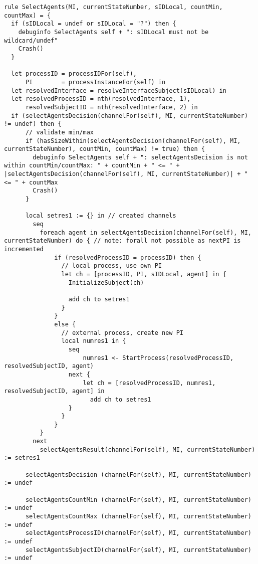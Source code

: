 \begin{listing}[H]
\begin{verbatim}
rule SelectAgents(MI, currentStateNumber, sIDLocal, countMin, countMax) = {
  if (sIDLocal = undef or sIDLocal = "?") then {
    debuginfo SelectAgents self + ": sIDLocal must not be wildcard/undef"
    Crash()
  }

  let processID = processIDFor(self),
      PI        = processInstanceFor(self) in
  let resolvedInterface = resolveInterfaceSubject(sIDLocal) in
  let resolvedProcessID = nth(resolvedInterface, 1),
      resolvedSubjectID = nth(resolvedInterface, 2) in
  if (selectAgentsDecision(channelFor(self), MI, currentStateNumber) != undef) then {
      // validate min/max
      if (hasSizeWithin(selectAgentsDecision(channelFor(self), MI, currentStateNumber), countMin, countMax) != true) then {
        debuginfo SelectAgents self + ": selectAgentsDecision is not within countMin/countMax: " + countMin + " <= " + |selectAgentsDecision(channelFor(self), MI, currentStateNumber)| + " <= " + countMax
        Crash()
      }

      local setres1 := {} in // created channels
        seq
          foreach agent in selectAgentsDecision(channelFor(self), MI, currentStateNumber) do { // note: forall not possible as nextPI is incremented
              if (resolvedProcessID = processID) then {
                // local process, use own PI
                let ch = [processID, PI, sIDLocal, agent] in {
                  InitializeSubject(ch)

                  add ch to setres1
                }
              }
              else {
                // external process, create new PI
                local numres1 in {
                  seq
                      numres1 <- StartProcess(resolvedProcessID, resolvedSubjectID, agent)
                  next {
                      let ch = [resolvedProcessID, numres1, resolvedSubjectID, agent] in
                        add ch to setres1
                  }
                }
              }
          }
        next
          selectAgentsResult(channelFor(self), MI, currentStateNumber) := setres1

      selectAgentsDecision (channelFor(self), MI, currentStateNumber) := undef

      selectAgentsCountMin (channelFor(self), MI, currentStateNumber) := undef
      selectAgentsCountMax (channelFor(self), MI, currentStateNumber) := undef
      selectAgentsProcessID(channelFor(self), MI, currentStateNumber) := undef
      selectAgentsSubjectID(channelFor(self), MI, currentStateNumber) := undef


\end{verbatim}
\end{listing}
